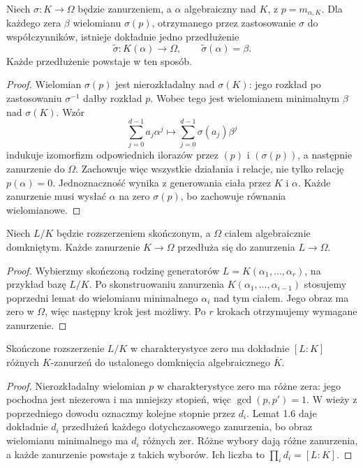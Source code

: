 \begin{lemat}
Niech $\sigma:K\to\Omega$ będzie zanurzeniem, a $\alpha$ algebraiczny nad $K$, z $p=m_{\alpha,K}$. Dla każdego zera $\beta$ wielomianu $\sigma(p)$, otrzymanego przez zastosowanie $\sigma$ do współczynników, istnieje dokładnie jedno przedłużenie
\[
\widetilde\sigma:K(\alpha)\longrightarrow\Omega,
\qquad \widetilde\sigma(\alpha)=\beta.
\]
Każde przedłużenie powstaje w ten sposób.
\end{lemat}
\begin{proof}
Wielomian $\sigma(p)$ jest nierozkładalny nad $\sigma(K)$: jego rozkład po zastosowaniu $\sigma^{-1}$ dałby rozkład $p$. Wobec tego jest wielomianem minimalnym $\beta$ nad $\sigma(K)$. Wzór
\[
\sum_{j=0}^{d-1}a_j\alpha^j\longmapsto
\sum_{j=0}^{d-1}\sigma(a_j)\beta^j
\]
indukuje izomorfizm odpowiednich ilorazów przez $(p)$ i $(\sigma(p))$, a następnie zanurzenie do $\Omega$. Zachowuje więc wszystkie działania i relacje, nie tylko relację $p(\alpha)=0$. Jednoznaczność wynika z generowania ciała przez $K$ i $\alpha$. Każde zanurzenie musi wysłać $\alpha$ na zero $\sigma(p)$, bo zachowuje równania wielomianowe.
\end{proof}

\begin{twierdzenie}
Niech $L/K$ będzie rozszerzeniem skończonym, a $\Omega$ ciałem algebraicznie domkniętym. Każde zanurzenie $K\to\Omega$ przedłuża się do zanurzenia $L\to\Omega$.
\end{twierdzenie}
\begin{proof}
Wybierzmy skończoną rodzinę generatorów $L=K(\alpha_1,\dots,\alpha_r)$, na przykład bazę $L/K$. Po skonstruowaniu zanurzenia $K(\alpha_1,\dots,\alpha_{i-1})$ stosujemy poprzedni lemat do wielomianu minimalnego $\alpha_i$ nad tym ciałem. Jego obraz ma zero w $\Omega$, więc następny krok jest możliwy. Po $r$ krokach otrzymujemy wymagane zanurzenie.
\end{proof}

\begin{twierdzenie}
Skończone rozszerzenie $L/K$ w charakterystyce zero ma dokładnie $[L:K]$ różnych $K$-zanurzeń do ustalonego domknięcia algebraicznego $\overline K$.
\end{twierdzenie}
\begin{proof}
Nierozkładalny wielomian $p$ w charakterystyce zero ma różne zera: jego pochodna jest niezerowa i ma mniejszy stopień, więc $\gcd(p,p')=1$. W wieży z poprzedniego dowodu oznaczmy kolejne stopnie przez $d_i$. Lemat 1.6 daje dokładnie $d_i$ przedłużeń każdego dotychczasowego zanurzenia, bo obraz wielomianu minimalnego ma $d_i$ różnych zer. Różne wybory dają różne zanurzenia, a każde zanurzenie powstaje z takich wyborów. Ich liczba to $\prod_i d_i=[L:K]$.
\end{proof}

